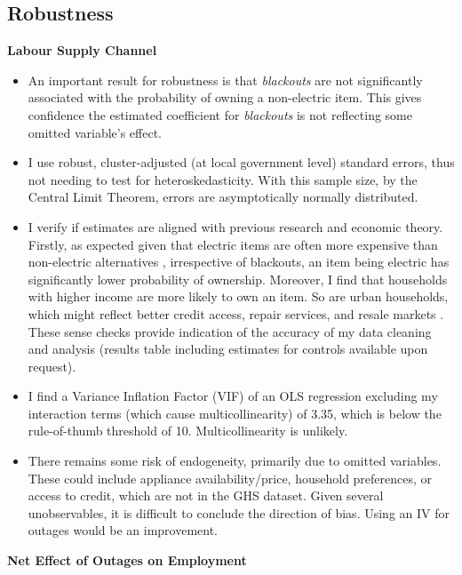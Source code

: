 \documentclass[12pt]{article}
\begin{document}
\subsection*{Robustness}
\textbf{Labour Supply Channel}
\par
\begin{itemize}
\item An important result for robustness is that \textit{blackouts} are not significantly associated with the probability of owning a non-electric item. This gives confidence the estimated coefficient for \textit{blackouts} is not reflecting some omitted variable's effect. 
\item  I use robust, cluster-adjusted (at local government level) standard errors, thus not needing to test for heteroskedasticity. With this sample size, by the Central Limit Theorem, errors are asymptotically normally distributed. 
   \item I verify if estimates are aligned with previous research and economic theory. Firstly, as expected given that electric items are often more expensive than non-electric alternatives \cite{koehlin2011a}, irrespective of blackouts, an item being electric has significantly lower probability of ownership. Moreover, I find that households with higher income are more likely to own an item. So are urban households, which might reflect better credit access, repair services, and resale markets \cite{jalan2002a}. These sense checks provide indication of the accuracy of my data cleaning and analysis (results table including estimates for controls available upon request).
    \item I find a Variance Inflation Factor (VIF) of an OLS regression excluding my interaction terms (which cause multicollinearity) of 3.35, which is below the rule-of-thumb threshold of 10. Multicollinearity is unlikely.
    \item There remains some risk of endogeneity, primarily due to omitted variables. These could include appliance availability/price, household preferences, or access to credit, which are not in the GHS dataset. Given several unobservables, it is difficult to conclude the direction of bias. Using an IV for outages would be an improvement.
\end{itemize}
\textbf{Net Effect of Outages on Employment}
\end{document}

